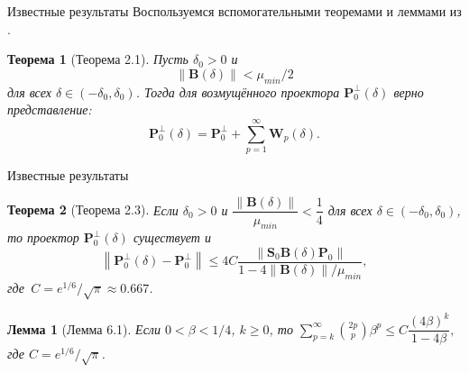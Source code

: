 \documentclass[notheorems, handout]{beamer}
\newtheorem{theorem}{Теорема}
\newtheorem{lemma}{Лемма}
\newcommand{\norm}[1]{\left\|#1\right\|}
\begin{document}
	\begin{frame}{Известные результаты}
		Воспользуемся вспомогательными теоремами и леммами из \cite{Nekrutkin10}.
		\begin{theorem}[Теорема 2.1]\label{th:2.1}
			Пусть $\delta_0>0$ и
			\begin{equation*}
				\norm{\mathbf{B}(\delta)}<\mu_{min}/2
			\end{equation*}
			для всех $\delta\in(-\delta_0,\delta_0)$. Тогда для возмущённого проектора $\mathbf{P}_0^\bot(\delta)$ верно представление:
			\begin{equation*}
				\mathbf{P}_0^\bot(\delta)=\mathbf{P}_0^\bot + \sum_{p=1}^\infty\mathbf{W}_p(\delta).
			\end{equation*}
		\end{theorem}%
	\end{frame}
	\begin{frame}{Известные результаты}
		\begin{theorem}[Теорема 2.3]
			\label{th:2.3}
			 Если $\delta_0 > 0$ и $\dfrac{\norm{\mathbf{B}(\delta)}}{\mu_{min}} < \dfrac{1}{4}$ для всех $\delta \in (-\delta_0, \delta_0)$, то проектор $\mathbf{P}^\bot_0(\delta)$ существует и \begin{equation*}\norm{\mathbf{P}_0^\bot(\delta) - \mathbf{P}_0^\bot} \leqslant 4C\dfrac{\norm{\mathbf{S}_0\mathbf{B}(\delta)\mathbf{P}_0}}{1 - 4\norm{\mathbf{B}(\delta)}/\mu_{min}},
			\end{equation*}
			где $\,C = e^{1/6}/\sqrt{\pi}\approx0.667$.
		\end{theorem}%
		\begin{lemma}[Лемма 6.1]
			\label{lem:6.1}
			Если $0<\beta<{1}/{4}$, $k \geqslant 0$, то
			$\sum^\infty_{p=k}{2p \choose p}\beta^p \leqslant C\dfrac{(4\beta)^k}{1-4\beta},$ где $C = e^{1/6}/\sqrt{\pi}$.
		\end{lemma}%
	\end{frame}
\end{document}
